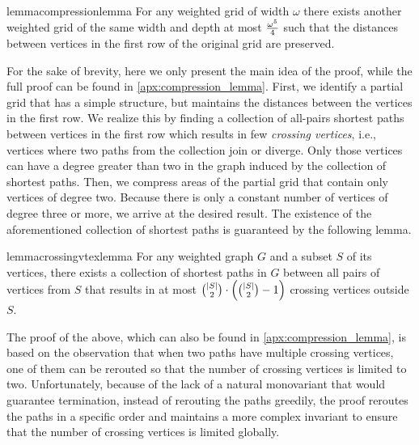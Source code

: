     \begin{restatable}{lemma}{compressionlemma}\label{lemma:compression}
    For any weighted grid of width $\omega$ there exists another weighted grid of the same width and depth at most $\frac{\omega^5}{4}$
    such that the distances between vertices in the first row of the original grid are preserved.
    \end{restatable}

    For the sake of brevity, here we only present the main idea of the proof, while the full proof can be found in \cref{apx:compression_lemma}.
    First, we identify a partial grid that has a simple structure, but maintains the distances between the vertices in the first row.
    We realize this by finding a collection of all-pairs shortest paths between vertices in the first row which results
    in few \emph{crossing vertices}, i.e., vertices where two paths from the collection join or diverge.
    Only those vertices can have a degree greater than two in the graph induced by the collection of shortest paths.
    Then, we compress areas of the partial grid that contain only vertices of degree two.
    Because there is only a constant number of vertices of degree three or more, we arrive at the desired result.
    The existence of the aforementioned collection of shortest paths is guaranteed by the following lemma.

    \begin{restatable}{lemma}{crossingvtexlemma}
    \label{lemma:crossing_vertices}
    For any weighted graph $G$ and a subset $S$ of its vertices, there exists a collection
    of shortest paths in $G$ between all pairs of vertices from $S$ that results in at most
    ${\left| S \right| \choose 2} \cdot \left( {\left| S \right| \choose 2} - 1 \right)$ crossing vertices outside $S$.
    \end{restatable}

    The proof of the above, which can also be found in \cref{apx:compression_lemma}, is based on the observation that
    when two paths have multiple crossing vertices, one of them can be rerouted so that the number of crossing vertices is limited to two.
    Unfortunately, because of the lack of a natural monovariant that would guarantee termination, instead
    of rerouting the paths greedily, the proof
    reroutes the paths in a specific order and maintains a more complex invariant to ensure that the
    number of crossing vertices is limited globally.